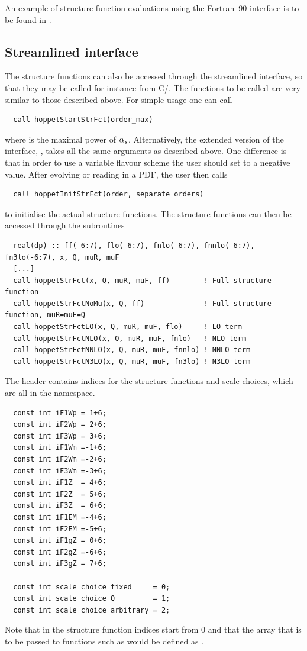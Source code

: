 An example of structure function evaluations using the Fortran~90
interface is to be found in
. 

\subsection{Streamlined interface}
\label{sec:structure-functions-streamlined}
The structure functions can also be accessed through the streamlined
interface, so that they may be called for instance from C/\CPP{}. The
functions to be called are very similar to those described above.
%
For simple usage one can call 
\begin{lstlisting}
  call hoppetStartStrFct(order_max)
\end{lstlisting}
where 
%
is the maximal
power of $\alpha_s$.
%
Alternatively, the extended version of the interface,
,  takes all the same arguments as
 described above. One difference is that in order to
use a variable flavour scheme the user should set  to a
negative value. After evolving or reading in a PDF, the user then calls
\begin{lstlisting}
  call hoppetInitStrFct(order, separate_orders)
\end{lstlisting}
to initialise the actual structure functions. The structure functions
can then be accessed through the subroutines
\begin{lstlisting}
  real(dp) :: ff(-6:7), flo(-6:7), fnlo(-6:7), fnnlo(-6:7), fn3lo(-6:7), x, Q, muR, muF
  [...]
  call hoppetStrFct(x, Q, muR, muF, ff)        ! Full structure function
  call hoppetStrFctNoMu(x, Q, ff)              ! Full structure function, muR=muF=Q
  call hoppetStrFctLO(x, Q, muR, muF, flo)     ! LO term
  call hoppetStrFctNLO(x, Q, muR, muF, fnlo)   ! NLO term
  call hoppetStrFctNNLO(x, Q, muR, muF, fnnlo) ! NNLO term
  call hoppetStrFctN3LO(x, Q, muR, muF, fn3lo) ! N3LO term
\end{lstlisting}
The \CPP{} header contains indices for the structure functions and scale
choices, which are all in the  namespace.
%
\begin{lstlisting}
  const int iF1Wp = 1+6;
  const int iF2Wp = 2+6;
  const int iF3Wp = 3+6;
  const int iF1Wm =-1+6;
  const int iF2Wm =-2+6;
  const int iF3Wm =-3+6;
  const int iF1Z  = 4+6;
  const int iF2Z  = 5+6;
  const int iF3Z  = 6+6;
  const int iF1EM =-4+6;
  const int iF2EM =-5+6;
  const int iF1gZ = 0+6;
  const int iF2gZ =-6+6;
  const int iF3gZ = 7+6;

  const int scale_choice_fixed     = 0;
  const int scale_choice_Q         = 1;
  const int scale_choice_arbitrary = 2;
\end{lstlisting}
Note that in \CPP{} the structure function indices start from 0 and that the \CPP{}
array that is to be passed to functions such as 
would be defined as .


